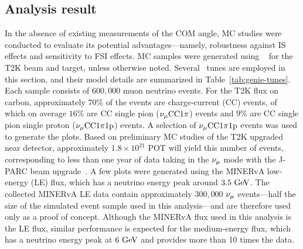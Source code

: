      \subsection{Analysis result}
     \label{sec:com-ana}
     In the absence of existing measurements of the COM angle, MC studies were conducted to evaluate its potential advantages—namely, robustness against IS effects and sensitivity to FSI effects.
     MC samples were generated using \genie\ \cite{Andreopoulos:2009rq, GENIE:2021npt} for the T2K beam and target, unless otherwise noted. 
     Several \genie\ tunes are employed in this section, and their model details are summarized in Table~\ref{tab:genie-tunes}.
     Each sample consists of $600,000$ muon neutrino events. 
     For the T2K flux on carbon, approximately $70\%$ of the events are charge‐current (CC) events, of which on average $16\%$ are CC single pion ($\nu_{\mu}\textrm{CC}1\pi$) events and $9\%$ are CC single pion single proton ($\nu_{\mu}\textrm{CC}1\pi1\textrm{p}$) events.
     A selection of $\nu_{\mu}\textrm{CC}1\pi1\textrm{p}$ events was used to generate the plots.
     Based on preliminary MC studies of the T2K upgraded near detector, approximately $1.8\times10^{21}$ POT will yield this number of events, corresponding to less than one year of data taking in the $\nu_{\mu}$ mode with the J-PARC beam upgrade~\cite{T2K:2019eao}.
     A few plots were generated using the MINERvA low-energy (LE) flux, which has a neutrino energy peak around $3.5~\textrm{GeV}$.
     The collected MINERvA LE data contain approximately $300,000$ $\nu_{\mu}$ events—half the size of the simulated event sample used in this analysis—and are therefore used only as a proof of concept.
     Although the MINERvA flux used in this analysis is the LE flux, similar performance is expected for the medium-energy flux, which has a neutrino energy peak at $6~\textrm{GeV}$ and provides more than 10 times the data.
